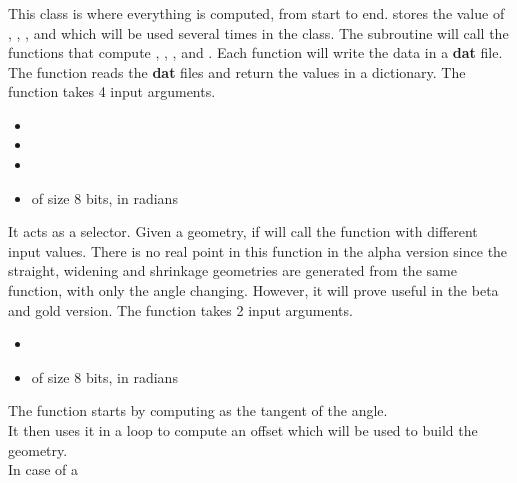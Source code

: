 \subsubsection{}
This class is where everything is computed, from start to end.
\smallbreak{}
 stores the value of , , ,  and
 which will be used several times in the class.
\smallbreak{}
The subroutine  will call the functions that compute ,
, ,  and . Each function
will write the data in a \textbf{dat} file.
\smallbreak{}
The function  reads the \textbf{dat} files and return the
values in a dictionary.
\smallbreak{}
The function  takes 4 input arguments.
\begin{itemize}
    \item {}
    \item {}
    \item {}
    \item {} of size 8 bits, in radians
\end{itemize}
It acts as a selector. Given a geometry, if will call the function
 with different input values. There is no real point in
this function in the alpha version since the straight, widening and shrinkage
geometries are generated from the same function, with only the angle changing.
However, it will prove useful in the beta and gold version.
\smallbreak{}
The function  takes 2 input arguments.
\begin{itemize}
    \item {} \textcolor{dtype}{}
    \item {} of size 8 bits, in radians
\end{itemize}
The function starts by computing  as the tangent of the angle.\\
It then uses it in a  loop to compute an offset which will be used to
build the geometry.\\
In case of a 
